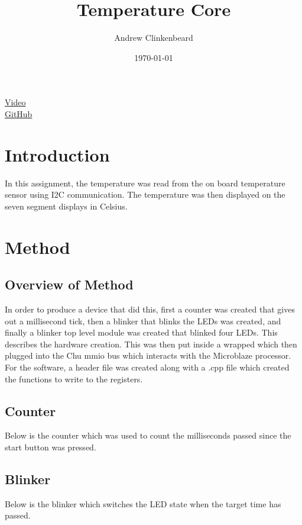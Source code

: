 \documentclass[12pt]{article}
\title{Temperature Core}
\author{Andrew Clinkenbeard}
\date{\today}
\newcommand{\Verilog}[2][]{%
	
}
\begin{document}
	\maketitle
	\href {https://www.youtube.com/watch?v=IYFFpxjsxYw} {Video}\\
	\href {https://github.com/andrew-clinkenbeard/Blinking-Led-Core} {GitHub}
	\section{Introduction}
	
	In this assignment, the temperature was read from the on board temperature sensor using I2C communication. The temperature was then displayed on the seven segment displays in Celsius.
	
	
	
	
	
	\section{Method}
	\subsection{Overview of Method}
	In order to produce a device that did this, first a counter was created that gives out a millisecond tick, then a blinker that blinks the LEDs was created, and finally a blinker top level module was created that blinked four LEDs. This describes the hardware creation. This was then put inside a wrapped which then plugged into the Chu mmio bus which interacts with the Microblaze processor. For the software, a header file was created along with a .cpp file which created the functions to write to the registers.
	
	\subsection{Counter}
	Below is the counter which was used to count the milliseconds passed since the start button was pressed.
	\Verilog[firstline=4]{./counter.sv}
	\subsection{Blinker}
	Below is the blinker which switches the LED state when the target time has passed.
	\Verilog[firstline=4]{./blinker.sv}
\end{document}
